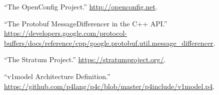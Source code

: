 \documentclass[11pt]{article}
\begin{document}
{{\begin{thebibliography}{44}
\mdbibitemlabel{{}[40]}\textquotedblleft{}The OpenConfig Project.\textquotedblright{} \href{http://openconfig.net}{{\ttfamily http://\hspace{0pt}openconfig.\hspace{0pt}net}}.\label{openconfig}%

\mdbibitemlabel{{}[41]}\textquotedblleft{}The Protobuf MessageDifferencer in the C++ API.\textquotedblright{} \href{https://developers.google.com/protocol-buffers/docs/reference/cpp/google.protobuf.util.message_differencer}{{\ttfamily https://\hspace{0pt}developers.\hspace{0pt}google.\hspace{0pt}com/\hspace{0pt}protocol-\hspace{0pt}buffers/\hspace{0pt}docs/\hspace{0pt}reference/\hspace{0pt}cpp/\hspace{0pt}google.\hspace{0pt}protobuf.\hspace{0pt}util.\hspace{0pt}message\_\hspace{0pt}differencer}}.\label{protomessagedifferencer}%

\mdbibitemlabel{{}[42]}\textquotedblleft{}The Stratum Project.\textquotedblright{} \href{https://stratumproject.org/}{{\ttfamily https://\hspace{0pt}stratumproject.\hspace{0pt}org/\hspace{0pt}}}.\label{stratum}%

\mdbibitemlabel{{}[43]}\textquotedblleft{}v1model Architecture Definition.\textquotedblright{} \href{https://github.com/p4lang/p4c/blob/master/p4include/v1model.p4}{{\ttfamily https://\hspace{0pt}github.\hspace{0pt}com/\hspace{0pt}p4lang/\hspace{0pt}p4c/\hspace{0pt}blob/\hspace{0pt}master/\hspace{0pt}p4include/\hspace{0pt}v1model.\hspace{0pt}p4}}.\label{v1model}%


\end{thebibliography}}}
\end{document}
